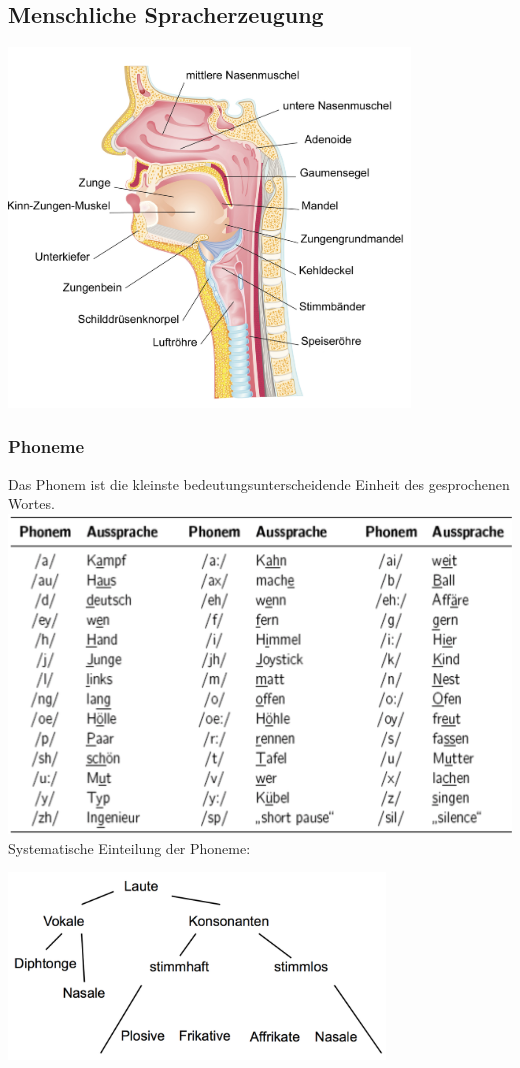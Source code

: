 \documentclass[german,color,6pt]{latex4ei/latex4ei_sheet}
\begin{document}
\begin{sectionbox}
	\subsection{Menschliche Spracherzeugung}
	\begin{center}
		\includegraphics[width=0.8\textwidth]{hals_anatomie}
	\end{center}
	\subsubsection{Phoneme}
	Das Phonem ist die kleinste bedeutungsunterscheidende Einheit des gesprochenen Wortes. \\
	\includegraphics[width=\textwidth]{phoneme} \\
	Systematische Einteilung der Phoneme:
	\begin{center}
		\includegraphics[width=0.75\textwidth]{phoneme_systematisch}
	\end{center}
\end{sectionbox}
\end{document}
